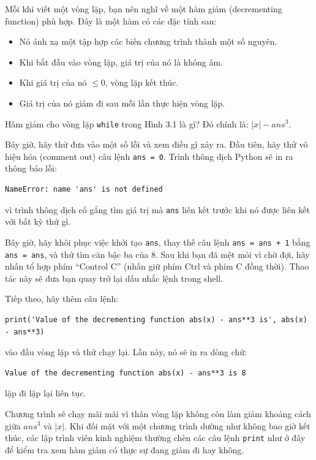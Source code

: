 Mỗi khi viết một vòng lặp, bạn nên nghĩ về một hàm giảm (decrementing function) phù hợp. Đây là một hàm có các đặc tính sau:

\begin{itemize}
    \item Nó ánh xạ một tập hợp các biến chương trình thành một số nguyên.
    \item Khi bắt đầu vào vòng lặp, giá trị của nó là không âm.
    \item Khi giá trị của nó $\le 0$, vòng lặp kết thúc.
    \item Giá trị của nó giảm đi sau mỗi lần thực hiện vòng lặp.
\end{itemize}

Hàm giảm cho vòng lặp \texttt{while} trong Hình 3.1 là gì? Đó chính là: $|x| - ans^3$.

Bây giờ, hãy thử đưa vào một số lỗi và xem điều gì xảy ra. Đầu tiên, hãy thử vô hiệu hóa (comment out) câu lệnh \texttt{ans = 0}. Trình thông dịch Python sẽ in ra thông báo lỗi:

\begin{verbatim}
NameError: name 'ans' is not defined
\end{verbatim}

vì trình thông dịch cố gắng tìm giá trị mà \texttt{ans} liên kết trước khi nó được liên kết với bất kỳ thứ gì.

Bây giờ, hãy khôi phục việc khởi tạo \texttt{ans}, thay thế câu lệnh \texttt{ans = ans + 1} bằng \texttt{ans = ans}, và thử tìm căn bậc ba của 8. Sau khi bạn đã mệt mỏi vì chờ đợi, hãy nhấn tổ hợp phím ``Control C'' (nhấn giữ phím Ctrl và phím C đồng thời). Thao tác này sẽ đưa bạn quay trở lại dấu nhắc lệnh trong shell.

Tiếp theo, hãy thêm câu lệnh:

\begin{verbatim}
print('Value of the decrementing function abs(x) - ans**3 is', abs(x) - ans**3)
\end{verbatim}

vào đầu vòng lặp và thử chạy lại. Lần này, nó sẽ in ra dòng chữ:

\begin{verbatim}
Value of the decrementing function abs(x) - ans**3 is 8
\end{verbatim}

lặp đi lặp lại liên tục.

Chương trình sẽ chạy mãi mãi vì thân vòng lặp không còn làm giảm khoảng cách giữa $ans^3$ và $|x|$. Khi đối mặt với một chương trình dường như không bao giờ kết thúc, các lập trình viên kinh nghiệm thường chèn các câu lệnh \texttt{print} như ở đây để kiểm tra xem hàm giảm có thực sự đang giảm đi hay không.

